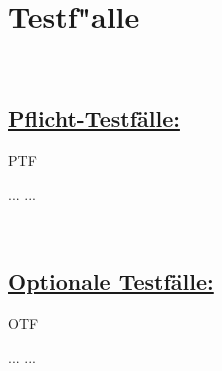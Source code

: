 %
%


%
%
\clearpage


\section{Testf{"a}lle}
\label{QS:TF}~\\

\subsection*{\underline{Pflicht-Testfälle:}}

\begin{ids}{\gls{PTF}}

	\id[ 1] ... 
	\id[10] ...

\end{ids}

~\\

\subsection*{\underline{Optionale Testfälle:}}

\begin{ids}{\gls{OTF}}

	\id[ 11] ...
	\id[100] ...

\end{ids}
